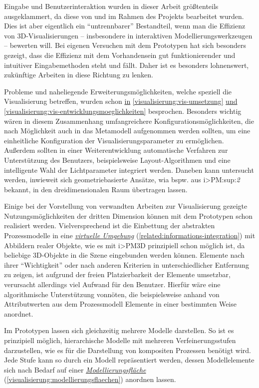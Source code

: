 \documentclass[a4paper,10pt]{sphinxmanual}
\begin{document}
Eingabe und Benutzerinteraktion wurden in dieser Arbeit größtenteils ausgeklammert, da diese von \cite{uli} und \cite{buchi} im Rahmen des Projekts bearbeitet wurden.
Dies ist aber eigentlich ein "`untrennbarer"' Bestandteil, wenn man die Effizienz von 3D-Visualisierungen – insbesondere in interaktiven Modellierungswerkzeugen – bewerten will.
Bei eigenen Versuchen mit dem Prototypen hat sich besonders gezeigt, dass die Effizienz mit dem Vorhandensein gut funktionierender und intuitiver Eingabemethoden steht und fällt.
Daher ist es besonders lohnenswert, zukünftige Arbeiten in diese Richtung zu lenken.

Probleme und naheliegende Erweiterungsmöglichkeiten, welche speziell die Visualisierung betreffen, wurden schon {\hyperref[visualisierung:vis-umsetzung]{in}} \autoref*{visualisierung:vis-umsetzung} {\hyperref[visualisierung:vis-entwicklungsmoeglichkeiten]{und}} \autoref*{visualisierung:vis-entwicklungsmoeglichkeiten} besprochen.
Besonders wichtig wären in diesem Zusammenhang umfangreichere Konfigurationsmöglichkeiten, die nach Möglichkeit auch in das Metamodell aufgenommen werden sollten, um eine einheitliche Konfiguration der Visualisierungsparameter zu ermöglichen.
Außerdem sollten in einer Weiterentwicklung automatische Verfahren zur Unterstützung des Benutzers, beispielsweise Layout-Algorithmen und eine intelligente Wahl der Lichtparameter integriert werden.
Daneben kann untersucht werden, inwieweit sich geometriebasierte Ansätze, wia bspw. aus i\textgreater{}PM:sup:\emph{2} bekannt, in den dreidimensionalen Raum übertragen lassen.

Einige bei der Vorstellung von verwandten Arbeiten zur Visualisierung gezeigte Nutzungsmöglichkeiten der dritten Dimension können mit dem Prototypen schon realisiert werden.
Vielversprechend ist die Einbettung der abstrakten Prozessmodelle in eine {\hyperref[related:informations-integration]{\emph{virtuelle Umgebung}}} (\autoref*{related:informations-integration}) mit Abbildern realer Objekte, wie es mit i\textgreater{}PM3D prinzipiell schon möglich ist, da beliebige 3D-Objekte in die Szene eingebunden werden können.
Elemente nach ihrer "`Wichtigkeit"' oder nach anderen Kriterien in unterschiedlicher Entfernung zu zeigen, ist aufgrund der freien Platzierbarkeit der Elemente umsetzbar, verursacht allerdings viel Aufwand für den Benutzer.
Hierfür wäre eine algorithmische Unterstützung vonnöten, die beispielsweise anhand von Attributwerten aus dem Prozessmodell Elemente in einer bestimmten Weise anordnet.

Im Prototypen lassen sich gleichzeitig mehrere Modelle darstellen.
So ist es prinzipiell möglich, hierarchische Modelle mit mehreren Verfeinerungsstufen darzustellen, wie es für die Darstellung von kompositen Prozessen benötigt wird.
Jede Stufe kann so durch ein Modell repräsentiert werden, dessen Modellelemente sich nach Bedarf auf einer {\hyperref[visualisierung:modellierungsflaechen]{\emph{Modellierungsfläche}}} (\autoref*{visualisierung:modellierungsflaechen}) anordnen lassen.
\end{document}
